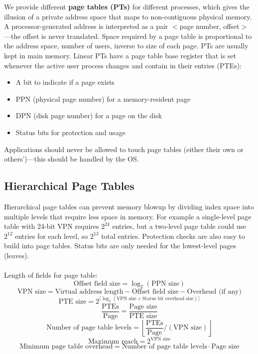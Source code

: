 \documentclass{article}
\begin{document}
We provide different \textbf{page tables (PTs)} for different processes, which gives the illusion of a private address space that maps to non-contiguous physical memory. A processor-generated address is interpreted as a pair $<$page number, offset$>$---the offset is never translated. Space required by a page table is proportional to the address space, number of users, inverse to size of each page. PTs are usually kept in main memory. Linear PTs have a page table base register that is set whenever the active user process changes and contain in their entries (PTEs):
\begin{itemize}
\item A bit to indicate if a page exists 
\item PPN (physical page number) for a memory-resident page 
\item DPN (disk page number) for a page on the disk 
\item Status bits for protection and usage
\end{itemize}
Applications should never be allowed to touch page tables (either their own or others')---this should be handled by the OS.

\subsection{Hierarchical Page Tables}
Hierarchical page tables can prevent memory blowup by dividing index space into multiple levels that require less space in memory. For example a single-level page table with 24-bit VPN requires $2^{24}$ entries, but a two-level page table could use $2^{12}$ entries for each level, so $2^{13}$ total entries. Protection checks are also easy to build into page tables. Status bits are only needed for the lowest-level pages (leaves). \\
\\
Length of fields for page table:
$$ \text{Offset field size} = \log_2(\text{PPN size}) $$
$$ \text{VPN size} = \text{Virtual address length} - \text{Offset field size} - \text{Overhead (if any)} $$
$$ \text{PTE size} = 2^{\lceil \log_2(\text{VPN size} + \text{Status bit overhead size}) \rceil} $$
$$ \frac{\text{PTEs}}{\text{Page}} = \frac{\text{Page size}}{\text{PTE size}} $$
$$ \text{Number of page table levels} = \left\lfloor \frac{\text{PTEs}}{\text{Page}} / (\text{VPN size}) \right\rfloor $$
$$ \text{Maximum reach} = 2^{\text{VPN size}} $$
$$ \text{Minimum page table overhead} = \text{Number of page table levels} \cdot \text{Page size} $$
\end{document}
